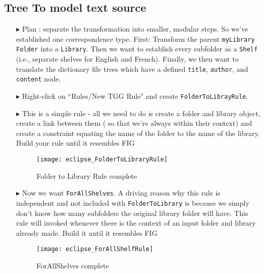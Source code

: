 \newpage
\hypertarget{treeToModel tex}{}
\subsection{Tree To model text source}
\texHeader

\begin{itemize}

\item[$\blacktriangleright$] Plan : separate the transformation into smaller, modular steps. So we've established one correspondence type. First: Transform the
parent \texttt{myLibrary} \texttt{Folder} into a \texttt{Library}. Then we want to establish every subfolder as a \texttt{Shelf} (i.e., separate shelves
for English and French). Finally, we then want to translate the dictionary file trees which have a defined \texttt{title}, \texttt{author}, and \texttt{content}
node.

\item[$\blacktriangleright$] Right-click on ``Rules/New TGG Rule" and create \texttt{FolderToLibrayRule}.

\item[$\blacktriangleright$] This is a simple rule - all we need to do is create a folder and library object, create a link between them ( so that we're
always within their context) and create a constraint equating the name of the folder to the name of the library. Build your rule until it resembles FIG

\begin{figure}[htbp]
\begin{center}
  \texttt{[image: eclipse\_FolderToLibraryRule]}
  \caption{Folder to Library Rule complete}
  \label{eclipse:FolderToLibraryRule}
\end{center}
\end{figure}

\item[$\blacktriangleright$] Now we want \texttt{ForAllShelves}. A driving reason why this rule is independent and not included with \texttt{FolderToLibrary} is
because we simply don't know how many subfolders the original library folder will have. This rule will invoked whenever there is the context of an input folder
and library already made. Build it until it resembles FIG

\begin{figure}[htbp]
\begin{center}
  \texttt{[image: eclipse\_ForAllShelfRule]}
  \caption{ForAllShelves complete}
  \label{eclipse:ForAllShelvesRule}
\end{center}
\end{figure}


\end{itemize}
